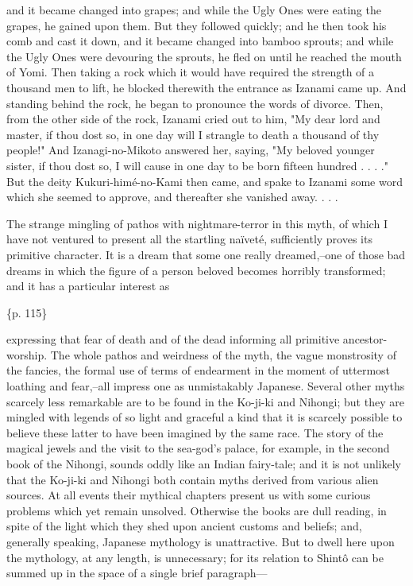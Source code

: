 and it became changed into grapes; and while the Ugly Ones were eating the grapes, he gained upon them. But they followed quickly; and he then took his comb and cast it down, and it became changed into bamboo sprouts; and while the Ugly Ones were devouring the sprouts, he fled on until he reached the mouth of Yomi. Then taking a rock which it would have required the strength of a thousand men to lift, he blocked therewith the entrance as Izanami came up. And standing behind the rock, he began to pronounce the words of divorce. Then, from the other side of the rock, Izanami cried out to him, "My dear lord and master, if thou dost so, in one day will I strangle to death a thousand of thy people!" And Izanagi-no-Mikoto answered her, saying, "My beloved younger sister, if thou dost so, I will cause in one day to be born fifteen hundred . . . ." But the deity Kukuri-himé-no-Kami then came, and spake to Izanami some word which she seemed to approve, and thereafter she vanished away. . . .



The strange mingling of pathos with nightmare-terror in this myth, of which I have not ventured to present all the startling naïveté, sufficiently proves its primitive character. It is a dream that some one really dreamed,--one of those bad dreams in which the figure of a person beloved becomes horribly transformed; and it has a particular interest as

\{p. 115\}

expressing that fear of death and of the dead informing all primitive ancestor-worship. The whole pathos and weirdness of the myth, the vague monstrosity of the fancies, the formal use of terms of endearment in the moment of uttermost loathing and fear,--all impress one as unmistakably Japanese. Several other myths scarcely less remarkable are to be found in the Ko-ji-ki and Nihongi; but they are mingled with legends of so light and graceful a kind that it is scarcely possible to believe these latter to have been imagined by the same race. The story of the magical jewels and the visit to the sea-god's palace, for example, in the second book of the Nihongi, sounds oddly like an Indian fairy-tale; and it is not unlikely that the Ko-ji-ki and Nihongi both contain myths derived from various alien sources. At all events their mythical chapters present us with some curious problems which yet remain unsolved. Otherwise the books are dull reading, in spite of the light which they shed upon ancient customs and beliefs; and, generally speaking, Japanese mythology is unattractive. But to dwell here upon the mythology, at any length, is unnecessary; for its relation to Shintô can be summed up in the space of a single brief paragraph---



